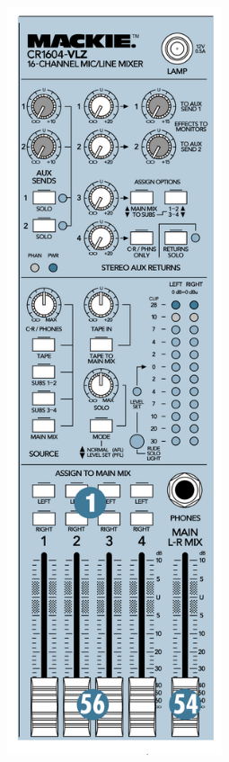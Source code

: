 \begin{multicols}{2}
\begin{center}
  \includegraphics[height=220mm]{Images/Mackie_2.png}
\end{center}
\end{multicols}


